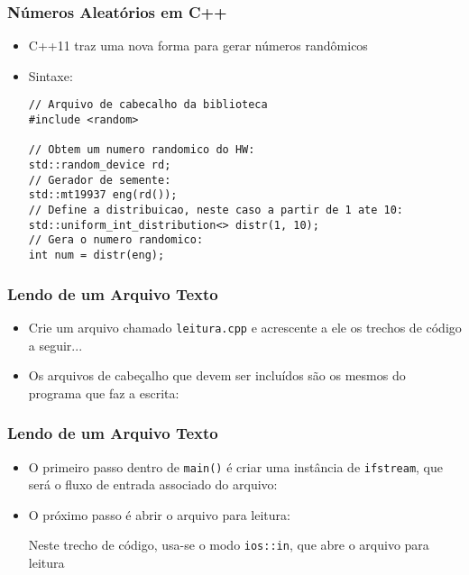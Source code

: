 \documentclass[aspectratio=169]{beamer}
\begin{document}
\begin{frame}[fragile]\frametitle{Números Aleatórios em C++}
\begin{itemize}
	\item C++11 traz uma nova forma para gerar números randômicos
	\item Sintaxe:
\begin{lstlisting}
// Arquivo de cabecalho da biblioteca
#include <random>

// Obtem um numero randomico do HW:
std::random_device rd;
// Gerador de semente:
std::mt19937 eng(rd());
// Define a distribuicao, neste caso a partir de 1 ate 10:
std::uniform_int_distribution<> distr(1, 10);
// Gera o numero randomico:
int num = distr(eng);
\end{lstlisting}
\end{itemize}
\end{frame}

\begin{frame}[fragile]\frametitle{Lendo de um Arquivo Texto}
\begin{itemize}
	\item Crie um arquivo chamado \texttt{leitura.cpp} e acrescente a ele os trechos de código a seguir...
	\item Os arquivos de cabeçalho que devem ser incluídos são os mesmos do programa que faz a escrita:

\end{itemize}
\end{frame}

\begin{frame}[fragile]\frametitle{Lendo de um Arquivo Texto}
\begin{itemize}
	\item O primeiro passo dentro de \texttt{main()} é criar uma instância de \texttt{ifstream}, que será o fluxo de entrada associado do arquivo:

	\item O próximo passo é abrir o arquivo para leitura:

	Neste trecho de código, usa-se o modo \texttt{ios::in}, que abre o arquivo para leitura
\end{itemize}
\end{frame}
\end{document}
